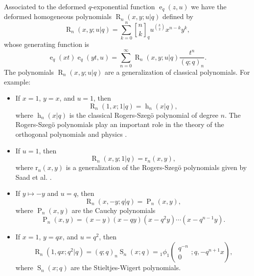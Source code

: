 \documentclass{cimart}
\newcommand{\qbinom}{\genfrac{[}{]}{0pt}{}}
\DeclareMathOperator{\ope}{e}
\DeclareMathOperator{\oph}{h}
\DeclareMathOperator{\opP}{P}
\DeclareMathOperator{\opR}{R}
\DeclareMathOperator{\opS}{S}
\begin{document}
Associated to the deformed $q$-exponential function $\ope_{q}(z,u)$ we have the deformed homogeneous polynomials $\opR_{n}(x,y;u|q)$ defined by
\begin{equation}
    \opR_{n}(x,y;u|q)=\sum_{k=0}^{n}\qbinom{n}{k}_{q}u^{\binom{k}{2}}x^{n-k}y^{k},
\end{equation}
whose generating function is
\begin{equation}
    \ope_{q}(xt)\ope_{q}(yt,u)=\sum_{n=0}^{\infty}\opR_{n}(x,y;u|q)\frac{t^n}{(q;q)_{n}}.
\end{equation}
The polynomials $\opR_{n}(x,y;u|q)$ are a generalization of classical polynomials. For example:
\begin{itemize}
    \item If $x=1$, $y=x$, and $u=1$, then
    \begin{equation}
    \opR_{n}(1,x;1|q)=\oph_{n}(x|q),
\end{equation}
where $\oph_{n}(x|q)$ is the classical Rogers-Szeg\"o polynomial of degree $n$. The Rogers-Szeg\"o polynomials play an important role in the theory of the orthogonal polynomials \cite{Al} and physics \cite{jag}. 

\item If $u=1$, then
\begin{equation}
    \opR_{n}(x,y;1|q)=\mathrm{r}_{n}(x,y),
\end{equation}
where $\mathrm{r}_{n}(x,y)$ is a generalization of the Rogers-Szeg\"o polynomials given by Saad et al. \cite{saad}.

\item If $y\mapsto-y$ and $u=q$, then
\begin{equation}
    \opR_{n}(x,-y;q|q)=\opP_{n}(x,y),
\end{equation}
where $\opP_{n}(x,y)$ are the Cauchy polynomials
\begin{equation*}
    \opP_{n}(x,y)=(x-y)(x-qy)(x-q^2y)\cdots(x-q^{n-1}y).
\end{equation*}

\item If $x=1$, $y=qx$, and $u=q^2$, then
\begin{equation}
    \opR_{n}(1,qx;q^2|q)=(q;q)_{n}\opS_{n}(x;q)={}_{1}\phi_{1}\left(\begin{array}{c}
         q^{-n}\\
         0
    \end{array};q,-q^{n+1}x\right),
\end{equation}
where $\opS_{n}(x;q)$ are the Stieltjes-Wigert polynomials.
\end{itemize}
\end{document}
